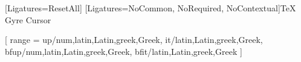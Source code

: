 
\newif\ifusenotoserif
\newif\ifusenotosans
\newif\ifusenotomono

\newif\ifusenotonaskharabic
\newif\ifusenotosansarabic


\ifenabledbidi
    \ifinswedish
        \usepackage[english, main=swedish, provide+=*, bidi=basic]{babel}
    \else
        \usepackage[swedish, main=english, provide+=*, bidi=basic]{babel}
    \fi
\else
    \ifinswedish
        \usepackage[english, main=swedish, provide+=*]{babel}
    \else
        \usepackage[swedish, main=english, provide+=*]{babel}
    \fi
\fi


\setmonofont{TeX Gyre Cursor}[Ligatures={ResetAll}]
[Ligatures={NoCommon, NoRequired, NoContextual}]{TeX Gyre Cursor}

\makeatletter

\usepackage{mathtools}
\usepackage[
  math-style=ISO,
  bold-style=ISO
]{unicode-math}

[
  range = {
    up/{num,latin,Latin,greek,Greek},
    it/{latin,Latin,greek,Greek},
    bfup/{num,latin,Latin,greek,Greek},
    bfit/{latin,Latin,greek,Greek}
  }
]



